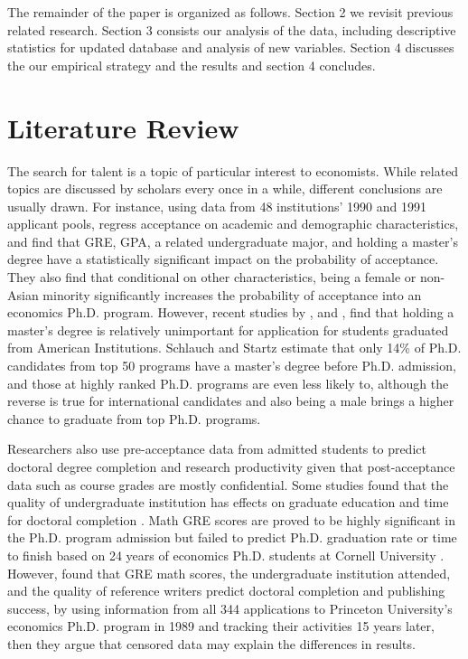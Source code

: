 \documentclass[12pt]{article}
\begin{document}
The remainder of the paper is organized as follows. Section 2 we revisit previous related research. Section 3 consists our analysis of the data, including descriptive statistics for updated database and analysis of new variables. Section 4 discusses the our empirical strategy and the results and section 4 concludes.

\section{Literature Review \label{sec:literature review}}
The search for talent is a topic of particular interest to economists. While related topics are discussed by scholars every once in a  while, different conclusions are usually drawn. For instance, using data from 48 institutions’ 1990 and 1991 applicant pools, \citet{Attiyeh1997TestingFB} regress acceptance on academic and demographic characteristics, and find that GRE, GPA, a related undergraduate major, and holding a master’s degree have a statistically significant impact on the probability of acceptance. They also find that conditional on other characteristics, being a female or non-Asian minority significantly increases the probability of acceptance into an economics Ph.D. program. However, recent studies by \citet{stock2007}, \citet{pathtoeconphd} and \citet{jones2020}, find that holding a master’s degree is relatively unimportant for application for students graduated from American Institutions. Schlauch and Startz estimate that only 14\% of Ph.D. candidates from top 50 programs have a master’s degree before Ph.D. admission, and those at highly ranked Ph.D. programs are even less likely to, although the reverse is true for international candidates and also being a male brings a higher chance to graduate from top Ph.D. programs.

Researchers also use pre-acceptance data from admitted students to predict doctoral degree completion and research productivity given that post-acceptance data such as course grades are mostly confidential. Some studies found that the quality of undergraduate institution has effects on graduate education and time for doctoral completion \citep{Tuckman1990}. Math GRE scores are proved to be highly significant in the Ph.D. program admission \citep{Attiyeh1997TestingFB, wu2000} but failed to predict Ph.D. graduation rate or time to finish based on 24 years of economics Ph.D. students at Cornell University \citep{Ehrenberg1995}. However, \citet{wu2007} found that GRE math scores, the undergraduate institution attended, and the quality of reference writers predict doctoral completion and publishing success, by using information from all 344 applications to Princeton University’s economics Ph.D. program in 1989 and tracking their activities 15 years later, then they argue that censored data may explain the differences in results.
\end{document}
